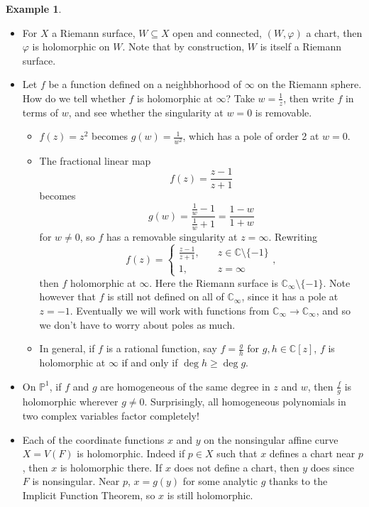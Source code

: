 \documentclass[12pt]{article}
\newcommand{\cx}{\mathbb{C}}
\newcommand{\p}{\mathbb{P}}
\theoremstyle{definition}
\newtheorem{example}[theorem]{Example}
\theoremstyle{remark}
\begin{document}
\begin{example}
    \noindent
    \begin{itemize}
        \item For $X$ a Riemann surface, $W\subseteq X$ open and connected, $(W,\varphi)$ a chart, then $\varphi$ is holomorphic on $W$. Note that by construction, $W$ is itself a Riemann surface.
        \item Let $f$ be a function defined on a neighbhorhood of $\infty$ on the Riemann sphere. How do we tell whether $f$ is holomorphic at $\infty$? Take $w=\frac{1}{z}$, then write $f$ in terms of $w$, and see whether the singularity at $w=0$ is removable.
        \begin{itemize}
            \item $f(z)=z^2$ becomes $g(w)=\frac{1}{w^2}$, which has a pole of order 2 at $w=0$.
            \item The fractional linear map 
            \begin{equation}
                f(z)=\frac{z-1}{z+1}
            \end{equation}
            becomes 
            \begin{equation}
                g(w)=\frac{\frac{1}{w}-1}{\frac{1}{w}+1}=\frac{1-w}{1+w}
            \end{equation}
            for $w\neq0$, so $f$ has a removable singularity at $z=\infty$. Rewriting
            \begin{equation}
                f(z)=
                \begin{cases}
                    \frac{z-1}{z+1},&\quad z\in\cx\setminus\{-1\}\\
                    1,&\quad z=\infty
                \end{cases},
            \end{equation}
            then $f$ holomorphic at $\infty$. Here the Riemann surface is $\cx_{\infty}\setminus\{-1\}$. Note however that $f$ is still not defined on all of $\cx_{\infty}$, since it has a pole at $z=-1$. Eventually we will work with functions from $\cx_{\infty}\to\cx_{\infty}$, and so we don't have to worry about poles as much.
            \item In general, if $f$ is a rational function, say $f=\frac{g}{h}$ for $g,h\in\cx[z]$, $f$ is holomorphic at $\infty$ if and only if $\deg h\geq\deg g$.
        \end{itemize}
        \item On $\p^1$, if $f$ and $g$ are homogeneous of the same degree in $z$ and $w$, then $\frac{f}{g}$ is holomorphic wherever $g\neq0$.
        Surprisingly, all homogeneous polynomials in two complex variables factor completely!
        \item Each of the coordinate functions $x$ and $y$ on the nonsingular affine curve $X=V(F)$ is holomorphic. Indeed if $p\in X$ such that $x$ defines a chart near $p$, then $x$ is holomorphic there. If $x$ does not define a chart, then $y$ does since $F$ is nonsingular. Near $p$, $x=g(y)$ for some analytic $g$ thanks to the Implicit Function Theorem, so $x$ is still holomorphic.
        

\end{itemize}
\end{example}
\end{document}
